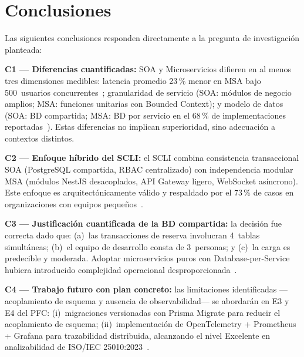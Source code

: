 \documentclass[conference,a4paper]{IEEEtran}
\begin{document}
\section{Conclusiones}
\label{sec:conclusiones}

Las siguientes conclusiones responden directamente a la
pregunta de investigaci\'on planteada:

\textbf{C1 --- Diferencias cuantificadas:} SOA y Microservicios
difieren en al menos tres dimensiones medibles: latencia
promedio 23\,\% menor en MSA bajo 500~usuarios
concurrentes~\cite{blinowski2022}; granularidad de servicio
(SOA: m\'odulos de negocio amplios; MSA: funciones unitarias
con Bounded Context); y modelo de datos (SOA: BD compartida;
MSA: BD por servicio en el 68\,\% de implementaciones
reportadas~\cite{alshuqayran2016}). Estas diferencias no
implican superioridad, sino adecuaci\'on a contextos distintos.

\textbf{C2 --- Enfoque h\'ibrido del SCLI:} el SCLI combina
consistencia transaccional SOA (PostgreSQL compartida, RBAC
centralizado) con independencia modular MSA (m\'odulos NestJS
desacoplados, API Gateway ligero, WebSocket as\'incrono). Este
enfoque es arquitect\'onicamente v\'alido y respaldado por el
73\,\% de casos en organizaciones con equipos
peque\~nos~\cite{aksakalli2021}.

\textbf{C3 --- Justificaci\'on cuantificada de la BD
compartida:} la decisi\'on fue correcta dado que: (a)~las
transacciones de reserva involucran 4~tablas simult\'aneas;
(b)~el equipo de desarrollo consta de 3~personas; y
(c)~la carga es predecible y moderada. Adoptar microservicios
puros con Database-per-Service hubiera introducido complejidad
operacional desproporcionada~\cite{velepucha2023}.

\textbf{C4 --- Trabajo futuro con plan concreto:} las
limitaciones identificadas ---acoplamiento de esquema y
ausencia de observabilidad--- se abordar\'an en E3 y E4
del PFC: (i)~migraciones versionadas con Prisma Migrate
para reducir el acoplamiento de esquema; (ii)~implementaci\'on
de OpenTelemetry + Prometheus + Grafana para trazabilidad
distribuida, alcanzando el nivel Excelente en analizabilidad
de ISO/IEC 25010:2023~\cite{iso25010}.

\printbibliography[title={Referencias}]
\end{document}
